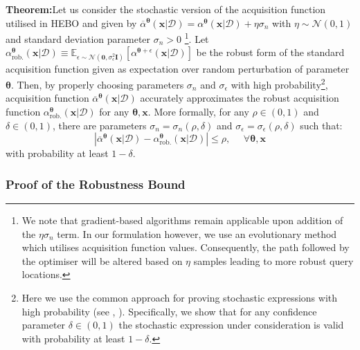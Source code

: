 \documentclass[jair,twoside,11pt,theapa]{article}
\let\cite\shortcite
\theoremstyle{definition}
\newenvironment{theorem}[1]{\par\noindent\textbf{Theorem:}\space#1}{}
\begin{document}
\begin{theorem}
Let us consider the  stochastic version of the acquisition function utilised in HEBO and given by $\overline{\alpha}^{\bm{\theta}} (\bm{x}|\mathcal{D}) = \alpha^{\bm{\theta}} (\bm{x}|\mathcal{D}) + \eta \sigma_{n}$ with $\eta \sim \mathcal{N}(0, 1)$ and  standard deviation parameter $\sigma_{n}>0$ \footnote{We note that gradient-based algorithms remain applicable upon addition of the $\eta \sigma_n$ term. In our formulation however, we use an evolutionary method which utilises acquisition function values. Consequently, the path followed by the optimiser will be altered based on $\eta$ samples leading to more robust query locations.}. Let $\alpha^{\bm{\theta}}_{\text{rob.}}(\bm{x}|\mathcal{D}) \equiv \mathbb{E}_{\epsilon \sim \mathcal{N}(\bm{0}, \sigma_{\epsilon}^{2}\bm{I})}\left[\alpha^{\bm{\theta}+\epsilon}(\bm{x}|\mathcal{D})\right]$ be the robust form of the standard acquisition function given as expectation over random perturbation of parameter $\bm{\theta}$. Then, by properly choosing parameters $\sigma_n$ and  $\sigma_{\epsilon}$ with high probability\footnote{Here we use the common approach for proving stochastic expressions with high probability (see \cite{jordan_cubic}, \cite{AZ01}). Specifically, we show that for any confidence parameter   $\delta\in(0,1)$ the stochastic expression under consideration is valid with probability at least $1 - \delta$.},  acquisition function  $\overline{\alpha}^{\bm{\theta}} (\bm{x}|\mathcal{D}) $ accurately approximates the robust acquisition function $\alpha^{\bm{\theta}}_{\text{rob.}}(\bm{x}|\mathcal{D})$ for any $\bm{\theta},\bm{x}$. More formally, for any $\rho\in(0,1)$ and $\delta \in(0,1)$, there are parameters $\sigma_n = \sigma_n(\rho,\delta)$ and $\sigma_{\epsilon} = \sigma_{\epsilon}(\rho, \delta)$ such that:    
\begin{equation*}
    \left|\overline{\alpha}^{\bm{\theta}} (\bm{x}|\mathcal{D}) - \alpha^{\bm{\theta}}_{\text{rob.}}(\bm{x}|\mathcal{D})\right| \leq \rho,  \ \ \ \ \ \ \forall \bm{\theta,x}
\end{equation*}
with probability at least $1 - \delta$.\\ 
\end{theorem}



\subsubsection{Proof of the Robustness Bound}\label{sec:prooflemma}
\end{document}
